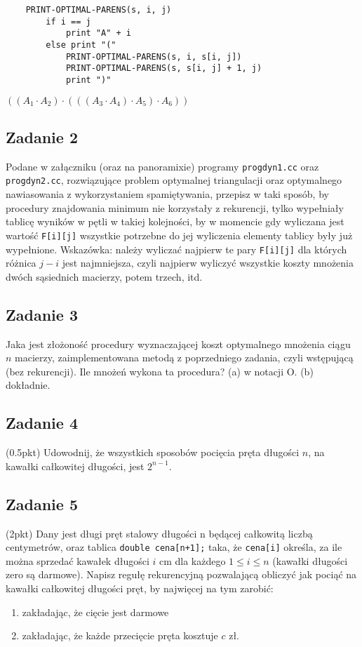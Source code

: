 \documentclass{article}
\begin{document}
\begin{center}
    \begin{lstlisting}
    PRINT-OPTIMAL-PARENS(s, i, j)
        if i == j
            print "A" + i
        else print "("
            PRINT-OPTIMAL-PARENS(s, i, s[i, j])
            PRINT-OPTIMAL-PARENS(s, s[i, j] + 1, j)
            print ")"
    \end{lstlisting}
    $((A_1 \cdot A_2) \cdot (((A_3 \cdot A_4) \cdot A_5) \cdot A_6))$
\end{center}

\subsection*{Zadanie 2}
Podane w załączniku (oraz na panoramixie) programy \verb|progdyn1.cc| oraz \verb|progdyn2.cc|,
rozwiązujące problem optymalnej triangulacji oraz optymalnego nawiasowania z wykorzystaniem
spamiętywania, przepisz w taki sposób, by procedury znajdowania minimum
nie korzystały z rekurencji, tylko wypełniały tablicę wyników w pętli w takiej kolejności,
by w momencie gdy wyliczana jest wartość \verb|F[i][j]| wszystkie potrzebne do jej wyliczenia
elementy tablicy były już wypełnione. Wskazówka: należy wyliczać najpierw te pary
\verb|F[i][j]| dla których różnica $j-i$ jest najmniejsza, czyli najpierw wyliczyć wszystkie
koszty mnożenia dwóch sąsiednich macierzy, potem trzech, itd.

\subsection*{Zadanie 3}
Jaka jest złożoność procedury wyznaczającej koszt optymalnego mnożenia ciągu
$n$ macierzy, zaimplementowana metodą z poprzedniego zadania, czyli wstępującą (bez rekurencji).
Ile mnożeń wykona ta procedura? (a) w notacji O. (b) dokładnie.

\subsection*{Zadanie 4}
(0.5pkt) Udowodnij, że wszystkich sposobów pocięcia pręta długości $n$, na kawałki całkowitej długości, jest $2^{n-1}$.

\subsection*{Zadanie 5}
(2pkt) Dany jest długi pręt stalowy długości n będącej całkowitą liczbą centymetrów,
oraz tablica \verb|double cena[n+1];| taka, że \verb|cena[i]| określa, za ile można sprzedać kawałek długości $i$
cm dla każdego $1 \leq i \leq n$ (kawałki długości zero są darmowe). Napisz
regułę rekurencyjną pozwalającą obliczyć jak pociąć na kawałki całkowitej długości pręt,
by najwięcej na tym zarobić:
\begin{enumerate}[label=(\alph*)]
    \item zakładając, że cięcie jest darmowe
    \item zakładając, że każde przecięcie pręta kosztuje $c$ zł.
\end{enumerate}
\end{document}
